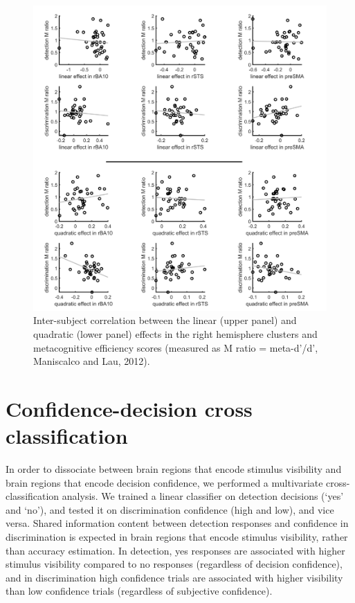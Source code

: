 \documentclass[12pt,twoside]{reedthesis}
\begin{document}
\begin{figure}
\includegraphics[width=\linewidth]{figure/ch3/efficiency} \caption[Inter-subject correlation between the linear and quadratic effects in the right hemisphere clusters and metacognitive efficiency scores]{Inter-subject correlation between the linear (upper panel) and quadratic (lower panel) effects in the right hemisphere clusters and metacognitive efficiency scores (measured as M ratio = meta-d'/d', Maniscalco and Lau, 2012).}\label{fig:varianceRatio}
\end{figure}
\hypertarget{app3:cross}{%
\section{Confidence-decision cross classification}\label{app3:cross}}

In order to dissociate between brain regions that encode stimulus visibility and brain regions that encode decision confidence, we performed a multivariate cross-classification analysis. We trained a linear classifier on detection decisions (`yes' and `no'), and tested it on discrimination confidence (high and low), and vice versa. Shared information content between detection responses and confidence in discrimination is expected in brain regions that encode stimulus visibility, rather than accuracy estimation. In detection, yes responses are associated with higher stimulus visibility compared to no responses (regardless of decision confidence), and in discrimination high confidence trials are associated with higher visibility than low confidence trials (regardless of subjective confidence).
\end{document}
